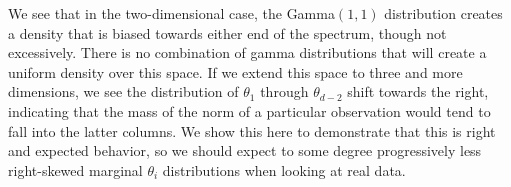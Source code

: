 We see that in the two-dimensional case, the Gamma$(1,1)$ distribution creates a
  density that is biased towards either end of the spectrum, though not excessively.
  There is no combination of gamma distributions that will create a uniform density
  over this space.   If we extend this space
  to three and more dimensions, we see the distribution of $\theta_1$ through
  $\theta_{d-2}$ shift towards the right, indicating that the mass of the norm of
  a particular observation would tend to fall into the latter columns.  We show this
  here to demonstrate that this is right and expected behavior, so we should expect
  to some degree progressively less right-skewed marginal $\theta_i$ distributions
  when looking at real data.
